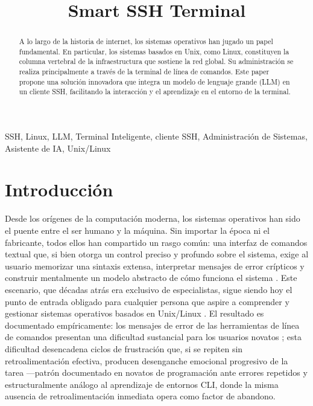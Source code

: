 \documentclass[conference]{IEEEtran} %
\title{Smart SSH Terminal}
\author{
    \IEEEauthorblockN{Andres Felipe Gonzalez Garzon, Haider Andres Cañon Murcia}
    \IEEEauthorblockA{
        Bogotá, Colombia \\ 
        \texttt{andres-gonzalez16@upc.edu.co, Haider-canon@upc.edu.co} %
    }
}
\begin{document}
\maketitle


\begin{abstract}
A lo largo de la historia de internet, los sistemas operativos han jugado 
un papel fundamental. En particular, los sistemas basados en Unix,
como Linux, constituyen la columna vertebral de la infraestructura que sostiene la red global.
Su administración se realiza principalmente a través de la terminal de línea de comandos. Este paper
propone una solución innovadora que integra un modelo de lenguaje grande (LLM) en un cliente SSH, 
facilitando la interacción y el aprendizaje en el entorno de la terminal.
\end{abstract}


\begin{IEEEkeywords}
SSH, Linux, LLM, Terminal Inteligente, cliente SSH, Administración de Sistemas, Asistente de IA, Unix/Linux
\end{IEEEkeywords}


\section{Introducción}
Desde los orígenes de la computación moderna, los sistemas operativos han 
sido el puente entre el ser humano y la máquina. Sin importar la época ni 
el fabricante, todos ellos han compartido un rasgo común: una interfaz de 
comandos textual que, si bien otorga un control preciso y profundo sobre el 
sistema, exige al usuario memorizar una sintaxis extensa, interpretar 
mensajes de error crípticos y construir mentalmente un modelo abstracto de 
cómo funciona el sistema \cite{shneiderman1982future}. Este escenario, que 
décadas atrás era exclusivo de especialistas, sigue siendo hoy el punto de 
entrada obligado para cualquier persona que aspire a comprender y gestionar 
sistemas operativos basados en Unix/Linux \cite{ritchie1974unix}. El 
resultado es documentado empíricamente: los mensajes de error de las 
herramientas de línea de comandos presentan una dificultad sustancial para 
los usuarios novatos \cite{becker2019compiler}; esta dificultad desencadena 
ciclos de frustración \cite{ossovski2024frustration} que, si se repiten sin 
retroalimentación efectiva, producen desenganche emocional progresivo de la 
tarea —patrón documentado en novatos de programación ante errores repetidos 
 \cite{bosch2017affective} y estructuralmente análogo al aprendizaje de 
entornos CLI, donde la misma ausencia de retroalimentación inmediata opera 
como factor de abandono. 
\end{document}
